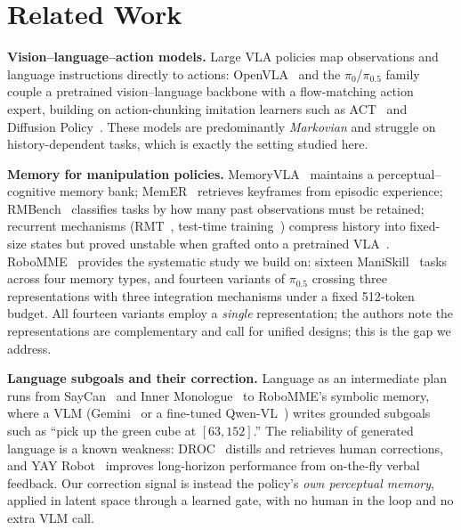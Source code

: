 \documentclass{article}
\begin{document}
\section{Related Work}
\label{sec:related}

\textbf{Vision--language--action models.} Large VLA policies map observations and language instructions directly to actions: OpenVLA~\cite{openvla} and the $\pi_0$/$\pi_{0.5}$ family~\cite{pi0,pi05} couple a pretrained vision--language backbone with a flow-matching action expert, building on action-chunking imitation learners such as ACT~\cite{act} and Diffusion Policy~\cite{diffusionpolicy}. These models are predominantly \emph{Markovian} and struggle on history-dependent tasks, which is exactly the setting studied here.

\textbf{Memory for manipulation policies.} MemoryVLA~\cite{memoryvla} maintains a perceptual--cognitive memory bank; MemER~\cite{memer} retrieves keyframes from episodic experience; RMBench~\cite{rmbench} classifies tasks by how many past observations must be retained; recurrent mechanisms (RMT~\cite{rmt}, test-time training~\cite{ttt}) compress history into fixed-size states but proved unstable when grafted onto a pretrained VLA~\cite{robomme2026}. RoboMME~\cite{robomme2026} provides the systematic study we build on: sixteen ManiSkill~\cite{maniskill3} tasks across four memory types, and fourteen variants of $\pi_{0.5}$ crossing three representations with three integration mechanisms under a fixed 512-token budget. All fourteen variants employ a \emph{single} representation; the authors note the representations are complementary and call for unified designs; this is the gap we address.

\textbf{Language subgoals and their correction.} Language as an intermediate plan runs from SayCan~\cite{saycan} and Inner Monologue~\cite{innermonologue} to RoboMME's symbolic memory, where a VLM (Gemini~\cite{gemini25} or a fine-tuned Qwen-VL~\cite{qwen25vl}) writes grounded subgoals such as ``pick up the green cube at $[63,152]$.'' The reliability of generated language is a known weakness: DROC~\cite{droc} distills and retrieves human corrections, and YAY Robot~\cite{yay} improves long-horizon performance from on-the-fly verbal feedback. Our correction signal is instead the policy's \emph{own perceptual memory}, applied in latent space through a learned gate, with no human in the loop and no extra VLM call.

\end{document}
